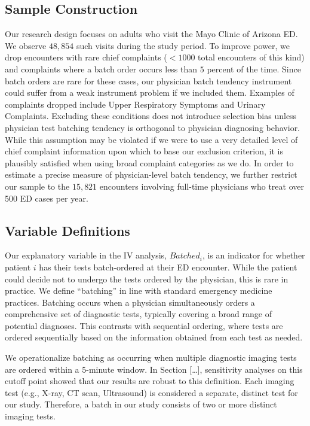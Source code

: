 \documentclass{article}
\begin{document}
\hypertarget{sample-construction}{%
\subsection{Sample Construction}\label{sample-construction}}

Our research design focuses on adults who visit the Mayo Clinic of
Arizona ED. We observe \(48,854\) such visits during the study period.
To improve power, we drop encounters with rare chief complaints
(\(<1000\) total encounters of this kind) and complaints where a batch
order occurs less than \(5\) percent of the time. Since batch orders are
rare for these cases, our physician batch tendency instrument could
suffer from a weak instrument problem if we included them. Examples of
complaints dropped include Upper Respiratory Symptoms and Urinary
Complaints. Excluding these conditions does not introduce selection bias
unless physician test batching tendency is orthogonal to physician
diagnosing behavior. While this assumption may be violated if we were to
use a very detailed level of chief complaint information upon which to
base our exclusion criterion, it is plausibly satisfied when using broad
complaint categories as we do. In order to estimate a precise measure of
physician-level batch tendency, we further restrict our sample to the
\(15,821\) encounters involving full-time physicians who treat over 500
ED cases per year.

\hypertarget{variable-definitions}{%
\subsection{Variable Definitions}\label{variable-definitions}}

Our explanatory variable in the IV analysis, \(Batched_i\), is an
indicator for whether patient \(i\) has their tests batch-ordered at
their ED encounter. While the patient could decide not to undergo the
tests ordered by the physician, this is rare in practice. We define
``batching'' in line with standard emergency medicine practices.
Batching occurs when a physician simultaneously orders a comprehensive
set of diagnostic tests, typically covering a broad range of potential
diagnoses. This contrasts with sequential ordering, where tests are
ordered sequentially based on the information obtained from each test as
needed.

We operationalize batching as occurring when multiple diagnostic imaging
tests are ordered within a 5-minute window. In Section {[}\ldots{]},
sensitivity analyses on this cutoff point showed that our results are
robust to this definition. Each imaging test (e.g., X-ray, CT scan,
Ultrasound) is considered a separate, distinct test for our study.
Therefore, a batch in our study consists of two or more distinct imaging
tests.
\end{document}
